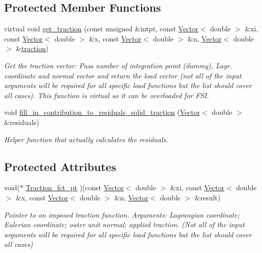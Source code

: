 \subsection*{Protected Member Functions}
\begin{DoxyCompactItemize}
\item 
virtual void \hyperlink{classoomph_1_1SolidTractionElement_ace61448de38dc67cbc0f7b42ed743eff}{get\+\_\+traction} (const unsigned \&intpt, const \hyperlink{classoomph_1_1Vector}{Vector}$<$ double $>$ \&xi, const \hyperlink{classoomph_1_1Vector}{Vector}$<$ double $>$ \&x, const \hyperlink{classoomph_1_1Vector}{Vector}$<$ double $>$ \&n, \hyperlink{classoomph_1_1Vector}{Vector}$<$ double $>$ \&\hyperlink{classoomph_1_1SolidTractionElement_ab00a3429962eb33612054e82095f8082}{traction})
\begin{DoxyCompactList}\small\item\em Get the traction vector\+: Pass number of integration point (dummy), Lagr. coordinate and normal vector and return the load vector (not all of the input arguments will be required for all specific load functions but the list should cover all cases). This function is virtual so it can be overloaded for F\+SI. \end{DoxyCompactList}\item 
void \hyperlink{classoomph_1_1SolidTractionElement_a214fcaf085d96c53115dd3d65677ab0c}{fill\+\_\+in\+\_\+contribution\+\_\+to\+\_\+residuals\+\_\+solid\+\_\+traction} (\hyperlink{classoomph_1_1Vector}{Vector}$<$ double $>$ \&residuals)
\begin{DoxyCompactList}\small\item\em Helper function that actually calculates the residuals. \end{DoxyCompactList}\end{DoxyCompactItemize}
\subsection*{Protected Attributes}
\begin{DoxyCompactItemize}
\item 
void($\ast$ \hyperlink{classoomph_1_1SolidTractionElement_af66418f6a001f5bc7e7dce7b67ae575e}{Traction\+\_\+fct\+\_\+pt} )(const \hyperlink{classoomph_1_1Vector}{Vector}$<$ double $>$ \&xi, const \hyperlink{classoomph_1_1Vector}{Vector}$<$ double $>$ \&x, const \hyperlink{classoomph_1_1Vector}{Vector}$<$ double $>$ \&n, \hyperlink{classoomph_1_1Vector}{Vector}$<$ double $>$ \&result)
\begin{DoxyCompactList}\small\item\em Pointer to an imposed traction function. Arguments\+: Lagrangian coordinate; Eulerian coordinate; outer unit normal; applied traction. (Not all of the input arguments will be required for all specific load functions but the list should cover all cases) \end{DoxyCompactList}\end{DoxyCompactItemize}
